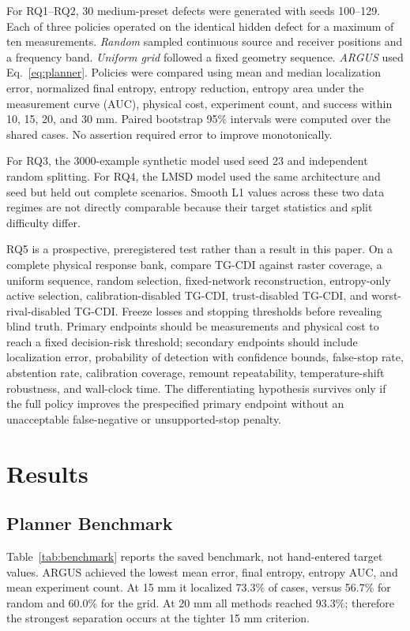 \documentclass[conference]{IEEEtran}
\begin{document}
For RQ1--RQ2, 30 medium-preset defects were generated with seeds 100--129. Each of three policies operated on the identical hidden defect for a maximum of ten measurements. \emph{Random} sampled continuous source and receiver positions and a frequency band. \emph{Uniform grid} followed a fixed geometry sequence. \emph{ARGUS} used Eq.~\eqref{eq:planner}. Policies were compared using mean and median localization error, normalized final entropy, entropy reduction, entropy area under the measurement curve (AUC), physical cost, experiment count, and success within 10, 15, 20, and 30 mm. Paired bootstrap 95\% intervals were computed over the shared cases. No assertion required error to improve monotonically.

For RQ3, the 3000-example synthetic model used seed 23 and independent random splitting. For RQ4, the LMSD model used the same architecture and seed but held out complete scenarios. Smooth L1 values across these two data regimes are not directly comparable because their target statistics and split difficulty differ.

RQ5 is a prospective, preregistered test rather than a result in this paper. On a complete physical response bank, compare TG-CDI against raster coverage, a uniform sequence, random selection, fixed-network reconstruction, entropy-only active selection, calibration-disabled TG-CDI, trust-disabled TG-CDI, and worst-rival-disabled TG-CDI. Freeze losses and stopping thresholds before revealing blind truth. Primary endpoints should be measurements and physical cost to reach a fixed decision-risk threshold; secondary endpoints should include localization error, probability of detection with confidence bounds, false-stop rate, abstention rate, calibration coverage, remount repeatability, temperature-shift robustness, and wall-clock time. The differentiating hypothesis survives only if the full policy improves the prespecified primary endpoint without an unacceptable false-negative or unsupported-stop penalty.

\section{Results}
\subsection{Planner Benchmark}
Table~\ref{tab:benchmark} reports the saved benchmark, not hand-entered target values. ARGUS achieved the lowest mean error, final entropy, entropy AUC, and mean experiment count. At 15 mm it localized 73.3\% of cases, versus 56.7\% for random and 60.0\% for the grid. At 20 mm all methods reached 93.3\%; therefore the strongest separation occurs at the tighter 15 mm criterion.
\end{document}
